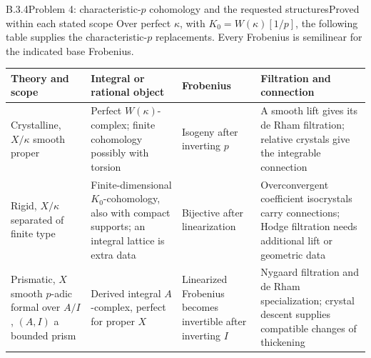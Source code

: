 \begin{result}{B.3.4}{Problem 4: characteristic-$p$ cohomology and the requested structures}{Proved within each stated scope}
Over perfect $\kappa$, with $K_0=W(\kappa)[1/p]$, the following
table supplies the characteristic-$p$ replacements. Every
Frobenius is semilinear for the indicated base Frobenius.
\end{result}
\begin{center}\small
\begin{longtable}{p{}p{}p{}p{}}
\toprule
Theory and scope&Integral or rational object&Frobenius&Filtration and connection\\
\midrule
\endhead
Crystalline, $X/\kappa$ smooth proper&Perfect $W(\kappa)$-complex;
finite cohomology possibly with torsion&Isogeny after inverting
$p$&A smooth lift gives its de Rham filtration; relative crystals
give the integrable connection\\
Rigid, $X/\kappa$ separated of finite type&Finite-dimensional
$K_0$-cohomology, also with compact supports; an integral lattice
is extra data&Bijective after linearization&Overconvergent
coefficient isocrystals carry connections; Hodge filtration
needs additional lift or geometric data\\
Prismatic, $X$ smooth $p$-adic formal over $A/I$, $(A,I)$ a bounded
prism&Derived integral $A$-complex, perfect for proper $X$&Linearized
Frobenius becomes invertible after inverting $I$&Nygaard
filtration and de Rham specialization; crystal descent supplies
compatible changes of thickening\\
\bottomrule
\end{longtable}
\end{center}
